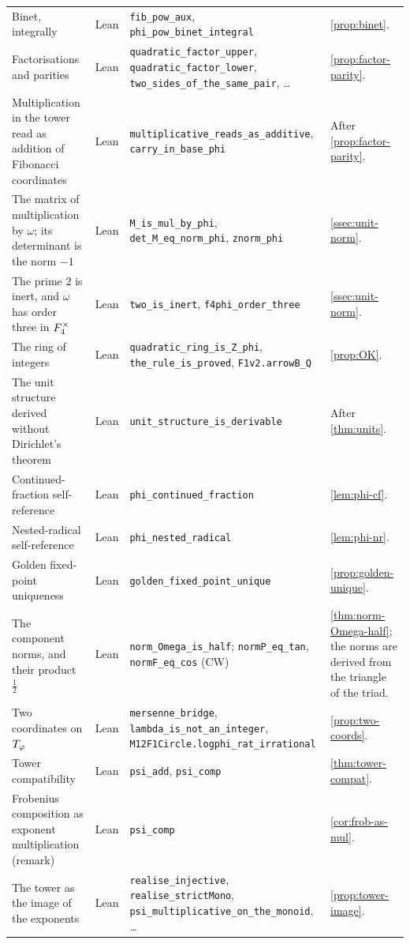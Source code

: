 {\begin{longtable}{>{\raggedright\arraybackslash}p{}>{\raggedright\arraybackslash}p{}>{\raggedright\arraybackslash}p{}>{\raggedright\arraybackslash}p{}}
Binet, integrally & Lean & \texttt{fib\_pow\_aux}, \texttt{phi\_pow\_binet\_integral} & \cref{prop:binet}.\\
Factorisations and parities & Lean & \texttt{quadratic\_factor\_upper}, \texttt{quadratic\_factor\_lower}, \texttt{two\_sides\_of\_the\_same\_pair}, \dots & \cref{prop:factor-parity}.\\
Multiplication in the tower read as addition of Fibonacci coordinates & Lean & \texttt{multiplicative\_reads\_as\_additive}, \texttt{carry\_in\_base\_phi} & After \cref{prop:factor-parity}.\\
The matrix of multiplication by $\omega$; its determinant is the norm $-1$ & Lean & \texttt{M\_is\_mul\_by\_phi}, \texttt{det\_M\_eq\_norm\_phi}, \texttt{znorm\_phi} & \cref{ssec:unit-norm}.\\
The prime $2$ is inert, and $\omega$ has order three in $F_4^\times$ & Lean & \texttt{two\_is\_inert}, \texttt{f4phi\_order\_three} & \cref{ssec:unit-norm}.\\
The ring of integers & Lean & \texttt{quadratic\_ring\_is\_Z\_phi}, \texttt{the\_rule\_is\_proved}, \texttt{F1v2.arrowB\_Q} & \cref{prop:OK}.\\
The unit structure derived without Dirichlet's theorem & Lean & \texttt{unit\_structure\_is\_derivable} & After \cref{thm:units}.\\
Continued-fraction self-reference & Lean & \texttt{phi\_continued\_fraction} & \cref{lem:phi-cf}.\\
Nested-radical self-reference & Lean & \texttt{phi\_nested\_radical} & \cref{lem:phi-nr}.\\
Golden fixed-point uniqueness & Lean & \texttt{golden\_fixed\_point\_unique} & \cref{prop:golden-unique}.\\
The component norms, and their product $\tfrac12$ & Lean & \texttt{norm\_Omega\_is\_half}; \texttt{normP\_eq\_tan}, \texttt{normF\_eq\_cos} (CW) & \cref{thm:norm-Omega-half}; the norms are derived from the triangle of the triad.\\
Two coordinates on $T_\varphi$ & Lean & \texttt{mersenne\_bridge}, \texttt{lambda\_is\_not\_an\_integer}, \texttt{M12F1Circle.logphi\_rat\_irrational} & \cref{prop:two-coords}.\\
Tower compatibility & Lean & \texttt{psi\_add}, \texttt{psi\_comp} & \cref{thm:tower-compat}.\\
Frobenius composition as exponent multiplication (remark) & Lean & \texttt{psi\_comp} & \cref{cor:frob-as-mul}.\\
The tower as the image of the exponents & Lean & \texttt{realise\_injective}, \texttt{realise\_strictMono}, \texttt{psi\_multiplicative\_on\_the\_monoid}, \dots & \cref{prop:tower-image}.\\

\end{longtable}}
